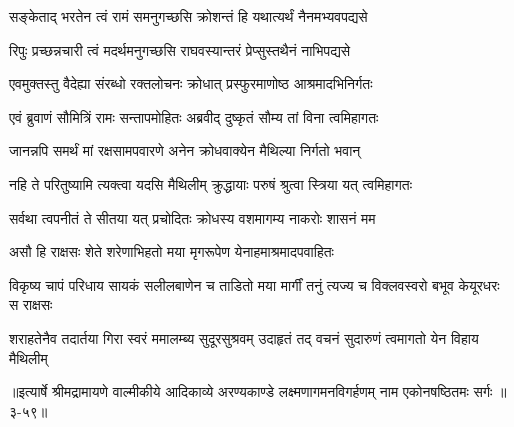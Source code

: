 \twolineshloka
{सङ्केताद् भरतेन त्वं रामं समनुगच्छसि}
{क्रोशन्तं हि यथात्यर्थं नैनमभ्यवपद्यसे} %

\twolineshloka
{रिपुः प्रच्छन्नचारी त्वं मदर्थमनुगच्छसि}
{राघवस्यान्तरं प्रेप्सुस्तथैनं नाभिपद्यसे} %

\twolineshloka
{एवमुक्तस्तु वैदेह्या संरब्धो रक्तलोचनः}
{क्रोधात् प्रस्फुरमाणोष्ठ आश्रमादभिनिर्गतः} %

\twolineshloka
{एवं ब्रुवाणं सौमित्रिं रामः सन्तापमोहितः}
{अब्रवीद् दुष्कृतं सौम्य तां विना त्वमिहागतः} %

\twolineshloka
{जानन्नपि समर्थं मां रक्षसामपवारणे}
{अनेन क्रोधवाक्येन मैथिल्या निर्गतो भवान्} %

\twolineshloka
{नहि ते परितुष्यामि त्यक्त्वा यदसि मैथिलीम्}
{क्रुद्धायाः परुषं श्रुत्वा स्त्रिया यत् त्वमिहागतः} %

\twolineshloka
{सर्वथा त्वपनीतं ते सीतया यत् प्रचोदितः}
{क्रोधस्य वशमागम्य नाकरोः शासनं मम} %

\twolineshloka
{असौ हि राक्षसः शेते शरेणाभिहतो मया}
{मृगरूपेण येनाहमाश्रमादपवाहितः} %

\twolineshloka
{विकृष्य चापं परिधाय सायकं सलीलबाणेन च ताडितो मया}
{मार्गीं तनुं त्यज्य च विक्लवस्वरो बभूव केयूरधरः स राक्षसः} %

\twolineshloka
{शराहतेनैव तदार्तया गिरा स्वरं ममालम्ब्य सुदूरसुश्रवम्}
{उदाहृतं तद् वचनं सुदारुणं त्वमागतो येन विहाय मैथिलीम्} %


॥इत्यार्षे श्रीमद्रामायणे वाल्मीकीये आदिकाव्ये अरण्यकाण्डे लक्ष्मणागमनविगर्हणम् नाम एकोनषष्ठितमः सर्गः ॥३-५९॥
